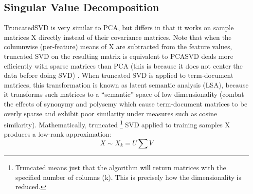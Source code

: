 \documentclass[11pt]{article}
\begin{document}
\subsection{Singular Value Decomposition}
TruncatedSVD is very similar to PCA, but differs in that it works on sample matrices X directly instead of their covariance matrices. Note that when the columnwise (per-feature) means of X are subtracted from the feature values, truncated SVD on the resulting matrix is equivalent to PCASVD deals more efficiently with sparse matrices than PCA (this is because it does not center the data before doing SVD) \cite{halko2009finding}. When truncated SVD is applied to term-document matrices, this transformation is known as latent semantic analysis (LSA), because it transforms such matrices to a “semantic” space of low dimensionality (combat the effects of synonymy and polysemy which cause term-document matrices to be overly sparse and exhibit poor similarity under measures such as cosine similarity).
Mathematically, truncated \footnote{Truncated means just that the algorithm will return matrices with the specified number of columns (k). This is precisely how the dimensionality is reduced.} SVD applied to training samples X produces a low-rank approximation:
\begin{equation}
X \sim X_k = U \sum V
\end{equation}
\end{document}
